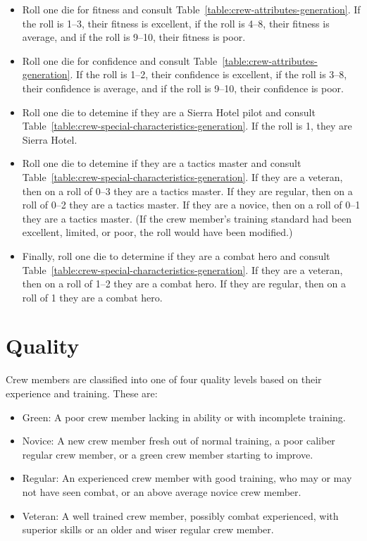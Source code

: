 \begin{advancedrules}
{\begin{itemize}
\item Roll one die for fitness and consult Table~\ref{table:crew-attributes-generation}. If the roll is 1--3, their fitness is excellent, if the roll is 4--8, their fitness is average, and if the roll is 9--10, their fitness is poor. 

\item Roll one die for confidence and consult Table~\ref{table:crew-attributes-generation}. If the  roll is 1--2, their confidence is excellent, if the roll is 3--8, their confidence is average, and if the roll is 9--10, their confidence is poor. 

\item Roll one die to detemine if they are a Sierra Hotel pilot and consult Table~\ref{table:crew-special-characteristics-generation}. If the roll is 1, they are Sierra Hotel. 

\item Roll one die to detemine if they are a tactics master and consult Table~\ref{table:crew-special-characteristics-generation}. If they are a veteran, then on a roll of 0--3 they are a tactics master. If they are regular, then on a roll of 0--2 they are a tactics master. If they are a novice, then on a roll of 0--1 they are a tactics master. (If the crew member's training standard had been excellent, limited, or poor, the roll would have been modified.)

\item Finally, roll one die to determine if they are a combat hero and consult Table~\ref{table:crew-special-characteristics-generation}.  If they are a veteran, then on a roll of 1--2 they are a combat hero. If they are regular, then on a roll of 1 they are a combat hero.
\end{itemize}

\section{Quality}
\label{rule:crew-quality}

Crew members are classified into one of four quality levels based on their experience and training. These are:

\begin{itemize}
    \item Green: A poor crew member lacking in ability or with incomplete training.
    \item Novice: A new crew member fresh out of normal training, a poor caliber regular crew member, or a green crew member starting to improve.
    \item Regular: An experienced crew member with good training, who may or may not have seen combat, or an above average novice crew member.
    \item Veteran: A well trained crew member, possibly combat experienced, with superior skills or an older and wiser regular crew member.
\end{itemize}

}
\end{advancedrules}
